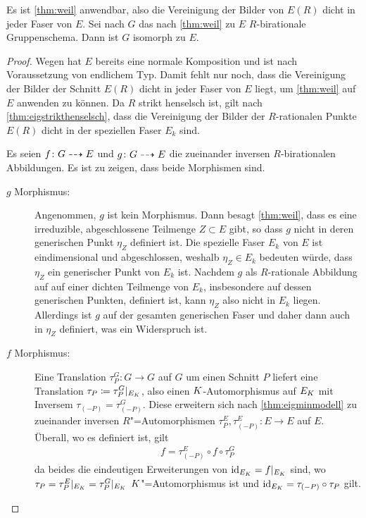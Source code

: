 \begin{Lemma}\label{thm:äqgruppenschema}
  Es ist \ref{thm:weil} anwendbar, also die Vereinigung der Bilder von
  $E(R)$ dicht in jeder Faser von $E$. Sei nach  $G$ das nach
  \ref{thm:weil} zu $E$ $R$-birationale Gruppenschema. Dann ist $G$
  isomorph zu $E$.
  \begin{proof}
    Wegen \label{thm:egruppenschema} hat $E$ bereits eine normale
    Komposition und ist nach Voraussetzung von endlichem Typ. Damit
    fehlt nur noch, dass die Vereinigung der Bilder der Schnitt $E(R)$
    dicht in jeder Faser von $E$ liegt, um \ref{thm:weil} auf $E$
    anwenden zu können.
    Da $R$ strikt henselsch ist, gilt nach
    \ref{thm:eigstrikthenselsch}, dass die Vereinigung der Bilder der
    $R$-rationalen Punkte $E(R)$ dicht in der speziellen Faser $E_k$
    sind.
    
    Es seien $f\colon G\dashrightarrow E$ und $g\colon G\dashrightarrow E$ die
    zueinander inversen $R$-birationalen Abbildungen.
    Es ist zu zeigen, dass beide Morphismen sind.
    \begin{description}
    \item[$g$ Morphismus:] Angenommen, $g$ ist kein
      Morphismus. Dann besagt \ref{thm:weil}, dass es eine
      irreduzible, abgeschlossene Teilmenge $Z\subset E$ gibt, so
      dass $g$ nicht in deren generischen Punkt $\eta_Z$ definiert
      ist. Die spezielle Faser $E_k$ von $E$ ist eindimensional und
      abgeschlossen, weshalb $\eta_Z\in E_k$ bedeuten würde, dass
      $\eta_Z$ ein generischer Punkt von $E_k$ ist.
      Nachdem $g$ als $R$-rationale Abbildung auf auf einer
      dichten Teilmenge von $E_k$, insbesondere auf dessen
      generischen Punkten, definiert ist, kann $\eta_Z$ also nicht in
      $E_k$ liegen.
      Allerdings ist $g$ auf der gesamten generischen Faser und daher
      dann auch in $\eta_Z$ definiert, was ein Widerspruch ist.
    \item[$f$ Morphismus:] Eine Translation $\tau_P^G\colon G\to G$
      auf $G$ um einen Schnitt $P$ liefert eine Translation
      $\tau_P\coloneqq\tau_P^G|_{E_{K}}$, also einen
      $K$-Automorphismus auf $E_{K}$ mit Inversem
      $\tau_{(-P)}=\tau_{(-P)}^G$. Diese 
      erweitern sich nach \ref{thm:eigminmodell} zu zueinander
      inversen $R$"=Automorphismen
      $\tau_P^E,\tau_{(-P)}^E\colon E\to E$ auf $E$.
      Überall, wo es definiert ist, gilt
      \begin{gather*}
        f = \tau_{(-P)}^E\circ f\circ \tau_P^G
      \end{gather*}
      da beides die eindeutigen Erweiterungen von
      $\mathrm{id}_{E_{K}}=f|_{E_{K}}$ sind, wo
      ${\tau_P=\tau_P^E|_{E_{K}}=\tau_P^G|_{E_{K}}}$
      $K$"=Automorphismus ist und ${\mathrm{id}_{E_{K}}=\tau_{(-P)}\circ\tau_P}$
      gilt.
      

\end{description}
\end{proof}
\end{Lemma}
